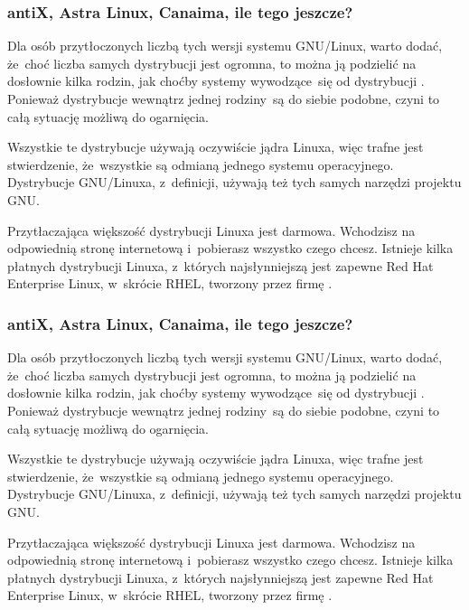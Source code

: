 \documentclass[10pt,t]{beamer}
\begin{document}
\begin{frame}
  \frametitle{antiX, Astra Linux, Canaima, ile tego jeszcze?}


  Dla osób przytłoczonych liczbą tych wersji systemu GNU/Linux, warto
  dodać, że~choć liczba samych dystrybucji jest ogromna, to można ją
  podzielić na dosłownie kilka rodzin, jak choćby systemy wywodzące~się od
  dystrybucji
  . Ponieważ
  dystrybucje wewnątrz jednej rodziny~są do siebie podobne, czyni to całą
  sytuację możliwą do ogarnięcia.

  Wszystkie te dystrybucje używają oczywiście jądra Linuxa, więc
  trafne jest stwierdzenie, że~wszystkie są odmianą jednego systemu
  operacyjnego. Dystrybucje GNU/Linuxa, z~definicji, używają też tych
  samych narzędzi projektu GNU.

  Przytłaczająca większość dystrybucji Linuxa jest darmowa. Wchodzisz
  na odpowiednią stronę internetową i~pobierasz wszystko czego chcesz.
  Istnieje kilka płatnych dystrybucji Linuxa, z~których najsłynniejszą jest
  zapewne
  {Red Hat Enterprise Linux}, w~skrócie RHEL, tworzony przez firmę
  .

\end{frame}




\begin{frame}
  \frametitle{antiX, Astra Linux, Canaima, ile tego jeszcze?}


  Dla osób przytłoczonych liczbą tych wersji systemu GNU/Linux, warto
  dodać, że~choć liczba samych dystrybucji jest ogromna, to można ją
  podzielić na dosłownie kilka rodzin, jak choćby systemy wywodzące~się od
  dystrybucji
  . Ponieważ
  dystrybucje wewnątrz jednej rodziny~są do siebie podobne, czyni to całą
  sytuację możliwą do ogarnięcia.

  Wszystkie te dystrybucje używają oczywiście jądra Linuxa, więc
  trafne jest stwierdzenie, że~wszystkie są odmianą jednego systemu
  operacyjnego. Dystrybucje GNU/Linuxa, z~definicji, używają też tych
  samych narzędzi projektu GNU.

  Przytłaczająca większość dystrybucji Linuxa jest darmowa. Wchodzisz
  na odpowiednią stronę internetową i~pobierasz wszystko czego chcesz.
  Istnieje kilka płatnych dystrybucji Linuxa, z~których najsłynniejszą jest
  zapewne
  {Red Hat Enterprise Linux}, w~skrócie RHEL, tworzony przez firmę
  .

\end{frame}
\end{document}
